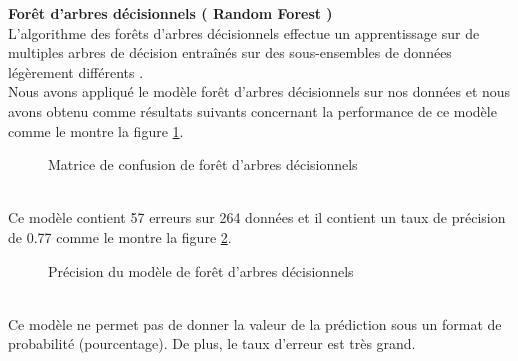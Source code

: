 \newpage

\textbf{Forêt d'arbres décisionnels ( Random Forest )} \\
L'algorithme des forêts d'arbres décisionnels effectue un apprentissage sur de multiples arbres de décision entraînés sur des sous-ensembles de données légèrement différents \cite{RandomForest}.\\
   Nous avons appliqué le modèle forêt d'arbres décisionnels sur nos données et nous avons obtenu comme résultats suivants concernant la performance de ce modèle comme le montre la figure \ref{fig:ConfusionRandomForest}.
     \begin{figure}[htpb]
    \centering
    \caption{Matrice de confusion de forêt d'arbres décisionnels}
    \label{fig:ConfusionRandomForest}
    \end{figure}
    \\
Ce modèle contient 57 erreurs sur 264 données et il contient un taux de précision de 0.77 comme le montre la figure \ref{fig:ConfusionMatrixRandomForestPrecisionss}.
   \begin{figure}[htpb]
    \centering
    \caption{Précision du modèle de forêt d'arbres décisionnels}
    \label{fig:ConfusionMatrixRandomForestPrecisionss}
    \end{figure}
    \\
    Ce modèle ne permet pas de donner la valeur de la prédiction sous un format de probabilité (pourcentage). De plus, le taux d’erreur est très grand.
    \newpage
    

